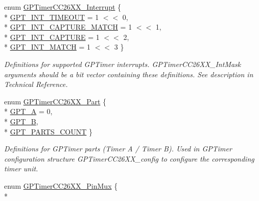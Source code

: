 \begin{DoxyCompactItemize}
enum \hyperlink{_g_p_timer_c_c26_x_x_8h_a1e0397cdf2412358dfdf0eb0df40db92}{G\+P\+Timer\+C\+C26\+X\+X\+\_\+\+Interrupt} \{ \\*
\hyperlink{_g_p_timer_c_c26_x_x_8h_a1e0397cdf2412358dfdf0eb0df40db92a6c6f5236dcbe5f37289a4a513451851e}{G\+P\+T\+\_\+\+I\+N\+T\+\_\+\+T\+I\+M\+E\+O\+U\+T} = 1 $<$$<$ 0, 
\\*
\hyperlink{_g_p_timer_c_c26_x_x_8h_a1e0397cdf2412358dfdf0eb0df40db92a438a33e76043ddb51f1c9e93820a8040}{G\+P\+T\+\_\+\+I\+N\+T\+\_\+\+C\+A\+P\+T\+U\+R\+E\+\_\+\+M\+A\+T\+C\+H} = 1 $<$$<$ 1, 
\\*
\hyperlink{_g_p_timer_c_c26_x_x_8h_a1e0397cdf2412358dfdf0eb0df40db92ae3e86fdcf14f9ff34c92aaf953b159d9}{G\+P\+T\+\_\+\+I\+N\+T\+\_\+\+C\+A\+P\+T\+U\+R\+E} = 1 $<$$<$ 2, 
\\*
\hyperlink{_g_p_timer_c_c26_x_x_8h_a1e0397cdf2412358dfdf0eb0df40db92a87f843ea54618ca92890d4db7f38f242}{G\+P\+T\+\_\+\+I\+N\+T\+\_\+\+M\+A\+T\+C\+H} = 1 $<$$<$ 3
 \}
\begin{DoxyCompactList}\small\item\em Definitions for supported G\+P\+Timer interrupts. G\+P\+Timer\+C\+C26\+X\+X\+\_\+\+Int\+Mask arguments should be a bit vector containing these definitions. See description in Technical Reference. \end{DoxyCompactList}\item 
enum \hyperlink{_g_p_timer_c_c26_x_x_8h_aff5462fa33c306f2c8bd29284fd898b0}{G\+P\+Timer\+C\+C26\+X\+X\+\_\+\+Part} \{ \\*
\hyperlink{_g_p_timer_c_c26_x_x_8h_aff5462fa33c306f2c8bd29284fd898b0a0630f8ce6004469fe81ebbc804e7ac2a}{G\+P\+T\+\_\+\+A} = 0, 
\\*
\hyperlink{_g_p_timer_c_c26_x_x_8h_aff5462fa33c306f2c8bd29284fd898b0a09aae74a0a9878654fa701a70b76387b}{G\+P\+T\+\_\+\+B}, 
\\*
\hyperlink{_g_p_timer_c_c26_x_x_8h_aff5462fa33c306f2c8bd29284fd898b0a492b59ed96b96d5bddcdee40e78712b0}{G\+P\+T\+\_\+\+P\+A\+R\+T\+S\+\_\+\+C\+O\+U\+N\+T}
 \}
\begin{DoxyCompactList}\small\item\em Definitions for G\+P\+Timer parts (Timer A / Timer B). Used in G\+P\+Timer configuration structure G\+P\+Timer\+C\+C26\+X\+X\+\_\+config to configure the corresponding timer unit. \end{DoxyCompactList}\item 
enum \hyperlink{_g_p_timer_c_c26_x_x_8h_ab4a2e82c659e0ea1fa2ae7a852298359}{G\+P\+Timer\+C\+C26\+X\+X\+\_\+\+Pin\+Mux} \{ \\*

\end{DoxyCompactItemize}
